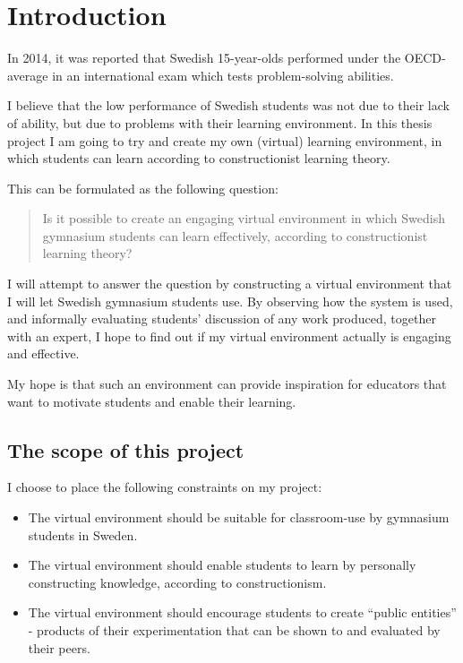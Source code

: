 \section{Introduction}

In 2014, it was reported that Swedish 15-year-olds performed under the OECD-average in an international exam which tests problem-solving abilities\cite{skolverket:pisa}.

I believe that the low performance of Swedish students was not due to their lack of ability, but due to problems with their learning environment. In this thesis project I am going to try and create my own (virtual) learning environment, in which students can learn according to constructionist learning theory.

This can be formulated as the following question:
\begin{quote}
Is it possible to create an engaging virtual environment in which Swedish gymnasium students can learn effectively, according to constructionist learning theory?
\end{quote}

I will attempt to answer the question by constructing a virtual environment that I will let Swedish gymnasium students use. By observing how the system is used, and informally evaluating students' discussion of any work produced, together with an expert, I hope to find out if my virtual environment actually is engaging and effective.

My hope is that such an environment can provide inspiration for educators that want to motivate students and enable their learning. 

\subsection{The scope of this project}

I choose to place the following constraints on my project:
\begin{itemize}
  \item The virtual environment should be suitable for classroom-use by gymnasium students in Sweden.
  \item The virtual environment should enable students to learn by personally constructing knowledge, according to constructionism.
  \item The virtual environment should encourage students to create ``public entities'' - products of their experimentation that can be shown to and evaluated by their peers.
\end{itemize}
